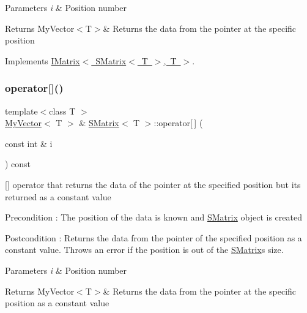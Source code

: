 \begin{DoxyParams}{Parameters}
{\em i} & Position number \\
\hline
\end{DoxyParams}
\begin{DoxyReturn}{Returns}
My\+Vector$<$\+T$>$\& Returns the data from the pointer at the specific position 
\end{DoxyReturn}


Implements \mbox{\hyperlink{class_i_matrix_a3cfb2490e2849c6c19c1979066a64818}{I\+Matrix$<$ S\+Matrix$<$ T $>$, T $>$}}.

\mbox{\label{class_s_matrix_ac67a58ec51953390848c0728dd070bf8}} 
\subsubsection{\texorpdfstring{operator[]()}{operator[]()}\hspace{0.1cm}{\footnotesize\ttfamily [2/2]}}
{\footnotesize\ttfamily template$<$class T $>$ \\
\mbox{\hyperlink{class_my_vector}{My\+Vector}}$<$ T $>$ \& \mbox{\hyperlink{class_s_matrix}{S\+Matrix}}$<$ T $>$\+::operator\mbox{[}$\,$\mbox{]} (\begin{DoxyParamCaption}\item[{const int \&}]{i }\end{DoxyParamCaption}) const\hspace{0.3cm}{\ttfamily [virtual]}}



\mbox{[}\mbox{]} operator that returns the data of the pointer at the specified position but its returned as a constant value 

\begin{DoxyPrecond}{Precondition}
\+: The position of the data is known and \mbox{\hyperlink{class_s_matrix}{S\+Matrix}} object is created 
\end{DoxyPrecond}
\begin{DoxyPostcond}{Postcondition}
\+: Returns the data from the pointer of the specified position as a constant value. Throws an error if the position is out of the \mbox{\hyperlink{class_s_matrix}{S\+Matrix}}\textquotesingle{}s size. 
\end{DoxyPostcond}

\begin{DoxyParams}{Parameters}
{\em i} & Position number \\
\hline
\end{DoxyParams}
\begin{DoxyReturn}{Returns}
My\+Vector$<$\+T$>$\& Returns the data from the pointer at the specific position as a constant value 
\end{DoxyReturn}


